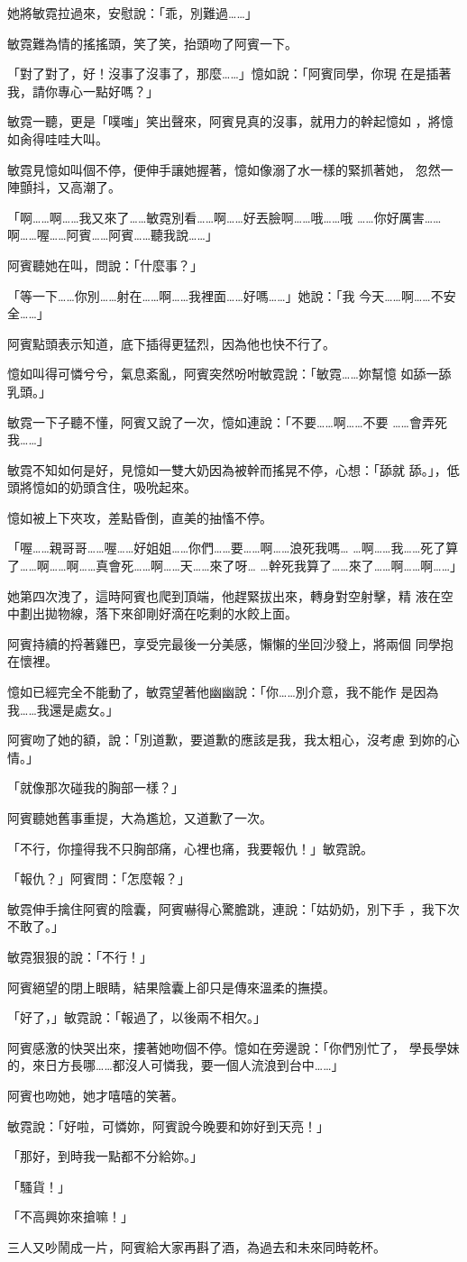 她將敏霓拉過來，安慰說：「乖，別難過……」

敏霓難為情的搖搖頭，笑了笑，抬頭吻了阿賓一下。

「對了對了，好！沒事了沒事了，那麼……」憶如說：「阿賓同學，你現
在是插著我，請你專心一點好嗎？」

敏霓一聽，更是「噗嗤」笑出聲來，阿賓見真的沒事，就用力的幹起憶如
，將憶如肏得哇哇大叫。

敏霓見憶如叫個不停，便伸手讓她握著，憶如像溺了水一樣的緊抓著她，
忽然一陣顫抖，又高潮了。

「啊……啊……我又來了……敏霓別看……啊……好丟臉啊……哦……哦
……你好厲害……啊……喔……阿賓……阿賓……聽我說……」

阿賓聽她在叫，問說：「什麼事？」

「等一下……你別……射在……啊……我裡面……好嗎……」她說：「我
今天……啊……不安全……」

阿賓點頭表示知道，底下插得更猛烈，因為他也快不行了。

憶如叫得可憐兮兮，氣息紊亂，阿賓突然吩咐敏霓說：「敏霓……妳幫憶
如舔一舔乳頭。」

敏霓一下子聽不懂，阿賓又說了一次，憶如連說：「不要……啊……不要
……會弄死我……」

敏霓不知如何是好，見憶如一雙大奶因為被幹而搖晃不停，心想：「舔就
舔。」，低頭將憶如的奶頭含住，吸吮起來。

憶如被上下夾攻，差點昏倒，直美的抽慉不停。

「喔……親哥哥……喔……好姐姐……你們……要……啊……浪死我嗎…
…啊……我……死了算了……啊……啊……真會死……啊……天……來了呀…
…幹死我算了……來了……啊……啊……」

她第四次洩了，這時阿賓也爬到頂端，他趕緊拔出來，轉身對空射擊，精
液在空中劃出拋物線，落下來卻剛好滴在吃剩的水餃上面。

阿賓持續的捋著雞巴，享受完最後一分美感，懶懶的坐回沙發上，將兩個
同學抱在懷裡。

憶如已經完全不能動了，敏霓望著他幽幽說：「你……別介意，我不能作
是因為我……我還是處女。」

阿賓吻了她的額，說：「別道歉，要道歉的應該是我，我太粗心，沒考慮
到妳的心情。」

「就像那次碰我的胸部一樣？」

阿賓聽她舊事重提，大為尷尬，又道歉了一次。

「不行，你撞得我不只胸部痛，心裡也痛，我要報仇！」敏霓說。

「報仇？」阿賓問：「怎麼報？」

敏霓伸手擒住阿賓的陰囊，阿賓嚇得心驚膽跳，連說：「姑奶奶，別下手
，我下次不敢了。」

敏霓狠狠的說：「不行！」

阿賓絕望的閉上眼睛，結果陰囊上卻只是傳來溫柔的撫摸。

「好了，」敏霓說：「報過了，以後兩不相欠。」

阿賓感激的快哭出來，摟著她吻個不停。憶如在旁邊說：「你們別忙了，
學長學妹的，來日方長哪……都沒人可憐我，要一個人流浪到台中……」

阿賓也吻她，她才嘻嘻的笑著。

敏霓說：「好啦，可憐妳，阿賓說今晚要和妳好到天亮！」

「那好，到時我一點都不分給妳。」

「騷貨！」

「不高興妳來搶嘛！」

三人又吵鬧成一片，阿賓給大家再斟了酒，為過去和未來同時乾杯。










